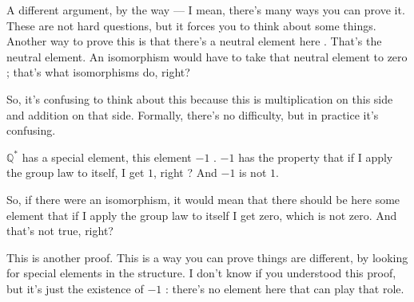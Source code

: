 \begin{speech}[00:34:45 - 00:35:57]
A different argument, by the way --- I mean, there's many ways you can prove it. These are not hard questions, but it forces you to think about some things. Another way to prove this is that there's a neutral element here . That's the neutral element. An isomorphism would have to take that neutral element to zero ; that's what isomorphisms do, right?

So, it's confusing to think about this because this is multiplication on this side and addition on that side. Formally, there's no difficulty, but in practice it's confusing.

$\mathbb{Q}^*$ has a special element, this element $-1$ . $-1$ has the property that if I apply the group law to itself, I get $1$, right ? And $-1$ is not $1$.

So, if there were an isomorphism, it would mean that there should be here  some element that if I apply the group law to itself I get zero, which is not zero. And that's not true, right?

This is another proof. This is a way you can prove things are different, by looking for special elements in the structure. I don't know if you understood this proof, but it's just the existence of $-1$ : there's no element here  that can play that role. 
\end{speech}

